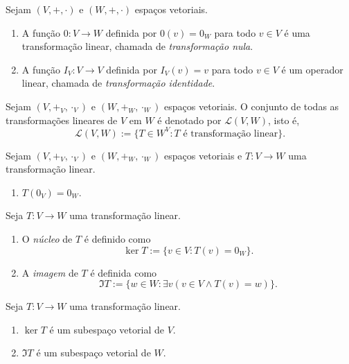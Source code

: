 \begin{example}
    Sejam $(V, +, \cdot)$ e $(W, +, \cdot)$ espaços vetoriais.
        \begin{enumerate}[leftmargin=*, align=left, label=\textbf{(\alph*)}]
            \item A função $0 : V \to W$ definida por $0(v) = 0_W$ para todo $v \in V$ é uma transformação linear, chamada de \emph{transformação nula}.
            \item A função $I_V : V \to V$ definida por $I_V(v) = v$ para todo $v \in V$ é um operador linear, chamada de \emph{transformação identidade}. 
        \end{enumerate}
\end{example}

\begin{definition}
    Sejam $(V, +_V, \cdot_V)$ e $(W, +_W, \cdot_W)$ espaços vetoriais. O conjunto de todas as transformações lineares de $V$ em $W$ é denotado por $\mathcal{L}(V,W)$, isto é,
        \[
            \mathcal{L}(V,W) := \{T \in W^V : T \text{ é transformação linear} \}.
        \]
\end{definition}

\begin{proposition}
    Sejam $(V, +_V, \cdot_V)$ e $(W, +_W, \cdot_W)$ espaços vetoriais e $T : V \to W$ uma transformação linear.
        \begin{enumerate}[leftmargin=*, align=left, label=\textbf{(\alph*)}]
            \item $T(0_V) = 0_W$.
        \end{enumerate}
\end{proposition}

\begin{definition}
    Seja $T : V \to W$ uma transformação linear.
        \begin{enumerate}[leftmargin=*, align=left, label=\textbf{(\alph*)}]
            \item O \emph{núcleo} de $T$ é definido como
                \[
                    \ker{T} := \{ v \in V : T(v) = 0_W \}.
                \]
            \item A \emph{imagem} de $T$ é definida como
                \[
                    \Im{T} := \{ w \in W : \exists v(v \in V \land T(v) = w) \}.
                \]
        \end{enumerate}
\end{definition}

\begin{theorem}
    Seja $T : V \to W$ uma transformação linear.
        \begin{enumerate}[leftmargin=*, align=left, label=\textbf{(\alph*)}]
            \item $\ker{T}$ é um subespaço vetorial de $V$.
            \item $\Im{T}$ é um subespaço vetorial de $W$.
        \end{enumerate}
\end{theorem}

